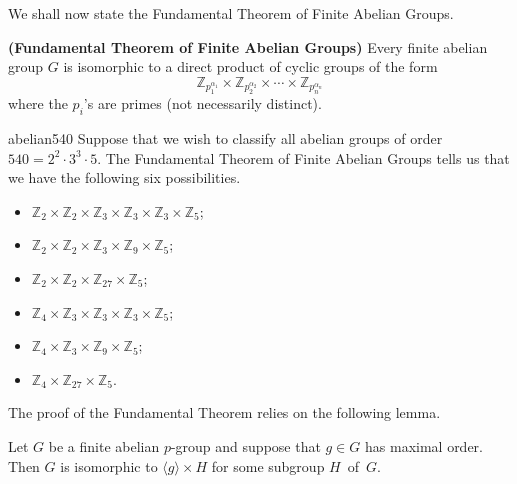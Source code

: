  
\medskip

We shall now state the Fundamental Theorem of Finite Abelian Groups. 
 
 
\begin{theorem}\label{struct:Finite_Abelian_Grps_Theorem}
{\bf (Fundamental Theorem of Finite Abelian
Groups)} 
Every finite abelian group $G$ is isomorphic to a direct product of
cyclic groups of the form 
\[
{\mathbb Z}_{p_1^{ \alpha_1 }}
\times
{\mathbb Z}_{p_2^{ \alpha_2 }}
\times
\cdots
\times
{\mathbb Z}_{p_n^{ \alpha_n }}
\]
where the $p_i$'s are primes (not necessarily distinct).
\end{theorem}
 
 
\begin{example}{abelian540}
Suppose that we wish to classify all abelian groups of order $540=2^2
\cdot 3^3 \cdot 5$.  The Fundamental Theorem of Finite Abelian Groups 
tells us that we have the following six possibilities.
\begin{itemize}
 
\item
${\mathbb Z}_2 \times {\mathbb Z}_2 \times {\mathbb Z}_3
\times {\mathbb Z}_3 \times {\mathbb Z}_3 \times {\mathbb Z}_5$;
 
\item
${\mathbb Z}_2 \times {\mathbb Z}_2 \times {\mathbb Z}_3
\times {\mathbb Z}_9 \times {\mathbb Z}_5$;
 
 
\item
${\mathbb Z}_2 \times {\mathbb Z}_2
\times {\mathbb Z}_{27} \times {\mathbb Z}_5$;
 
 
\item
${\mathbb Z}_4 \times {\mathbb Z}_3
\times {\mathbb Z}_3 \times {\mathbb Z}_3 \times {\mathbb Z}_5$;
 
\item
${\mathbb Z}_4 \times {\mathbb Z}_3
\times {\mathbb Z}_9 \times {\mathbb Z}_5$;
 
\item
${\mathbb Z}_4 \times {\mathbb Z}_{27} \times {\mathbb Z}_5$.
 
\end{itemize}
\end{example}
 
The  proof of the Fundamental Theorem relies on the following lemma.

\begin{lemma}\label{struct:lemma:finite_abelian}
Let $G$ be a finite abelian $p$-group and suppose that $g \in G$ has
maximal order. Then $G$ is isomorphic to $\langle g \rangle \times H$
for some subgroup $H$~of~$G$. 
\end{lemma}

